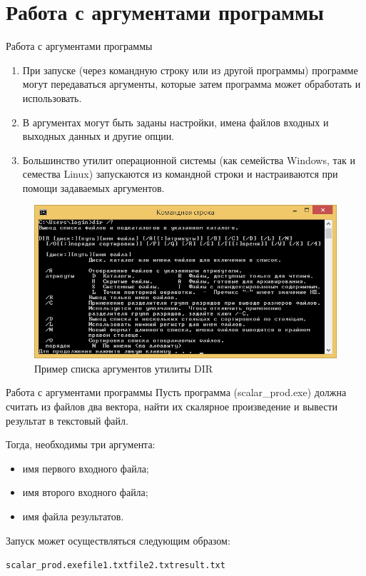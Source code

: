 \documentclass{beamer}
\begin{document}
\section{Работа с аргументами программы}
\begin{frame}
  \tableofcontents[currentsection]
\end{frame}

\begin{frame}[fragile]{Работа с аргументами программы}
\begin{enumerate}
\item При запуске (через командную строку или из другой программы) программе могут передаваться аргументы, которые затем программа может обработать и использовать.
\item В аргументах могут быть заданы настройки, имена файлов входных и выходных данных и другие опции.
\item Большинство утилит операционной системы (как семейства Windows, так и семества Linux) запускаются из командной строки и настраиваются при помощи задаваемых аргументов. 
\end{enumerate}
\begin{center}
\begin{figure}
\includegraphics[scale=0.3]{images/lec13-pic01.png}
\caption{Пример списка аргументов утилиты DIR}
\end{figure}
\end{center}
\end{frame}

\begin{frame}[fragile]{Работа с аргументами программы}
Пусть программа (scalar\_prod.exe) должна считать из файлов два вектора, найти их скалярное произведение и вывести результат в текстовый файл.

Тогда, необходимы три аргумента:
\begin{itemize}
\item имя первого входного файла;
\item имя второго входного файла;
\item имя файла результатов.
\end{itemize}

Запуск может осуществляться следующим образом:
\begin{alltt}
   scalar\_prod.exe file1.txt file2.txt result.txt
\end{alltt}
\end{frame}
\end{document}

